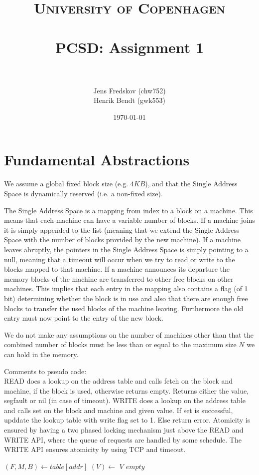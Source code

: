 \documentclass[a4paper, 11pt]{article}
\title{ 
\normalfont \normalsize 
\textsc{University of Copenhagen} \\ [25pt]
\horrule{0.5pt} \\[0.4cm]
\huge PCSD: Assignment 1 \\
\horrule{2pt} \\[0.5cm]
}
\author{Jens Fredskov (chw752)\\Henrik Bendt (gwk553)} %
\date{\normalsize\today} %
\begin{document}
\maketitle

\section{Fundamental Abstractions} %
\label{sec:fundamental_abstractions}

We assume a global fixed block size (e.g. $4KB$), and that the Single Address Space is dynamically reserved (i.e. a non-fixed size).

The Single Address Space is a mapping from index to a block on a machine. This means that each machine can have a variable number of blocks. If a machine joins it is simply appended to the list (meaning that we extend the Single Address Space with the number of blocks provided by the new machine). If a machine leaves abruptly, the pointers in the Single Address Space is simply pointing to a null, meaning that a timeout will occur when we try to read or write to the blocks mapped to that machine. If a machine announces its departure the memory blocks of the machine are transferred to other free blocks on other machines. This implies that each entry in the mapping also contains a flag (of 1 bit) determining whether the block is in use and also that there are enough free blocks to transfer the used blocks of the machine leaving. Furthermore the old entry must now point to the entry of the new block.

We do not make any assumptions on the number of machines other than that the combined number of blocks must be less than or equal to the maximum size $N$ we can hold in the memory.

Comments to pseudo code:\\
READ does a lookup on the address table and calls fetch on the block and machine, if the block is used, otherwise returns empty. Returns either the value, segfault or nil (in case of timeout).
WRITE does a lookup on the address table and calls set on the block and machine and given value. If set is successful, upddate the lookup table with write flag set to 1. Else return error.
Atomicity is ensured by having a two phased locking mechanism just above the READ and WRITE API, where the queue of requests are handled by some schedule. The WRITE API ensures atomicity by using TCP and timeout.


\begin{algorithmic}
    \State $(F, M, B) \gets table[addr]$
        \State $(V) \gets$ 
        \State \Return $V$
    \Else
        \State \Return $empty$
    \EndIf
\EndFunction
\end{algorithmic}
\end{document}
